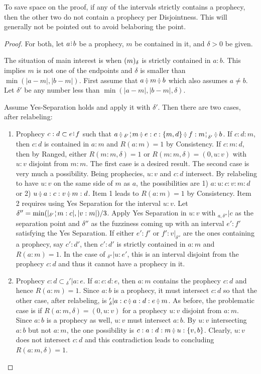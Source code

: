 \documentclass[12pt]{article}
\begin{document}
To save space on the proof, if any of the intervals strictly contains a prophecy, then the other two do not contain a prophecy per Disjointness. This will generally not be pointed out to avoid belaboring the point. 

\begin{proof}
    For both, let $a \rint b$ be a prophecy, $m$ be contained in it, and $\delta >0 $ be given.

    The situation of main interest is when $(m)_{\delta}$ is strictly contained in $a:b$. This implies $m$ is not one of the endpoints and $\delta$ is smaller than $\min(|a-m|, |b-m|)$. First assume that $a \betneq m \betneq b$ which also assumes $a \neq b$. Let $\delta'$ be any number less than $\min(|a-m|, |b-m|, \delta)$. 
    
    Assume Yes-Separation holds and apply it with $\delta'$. Then there are two cases, after relabeling: 

    \begin{enumerate}
        \item Prophecy $c:d \subset e\rint f$ such that $a\betneq \fuzbleft[\delta']{m} \betneq e : c : \{m, d\} \betneq f : \fuzbright[\delta']{m} \betneq b$. If $c:d:m$, then $c:d$ is contained in $a:m$ and $R(a:m)=1$ by Consistency. If $c:m:d$, then by Ranged, either $R(m:m, \delta) = 1$ or $R(m:m, \delta) = (0, u:v)$ with $u:v$ disjoint from $m:m$. The first case is a desired result. The second case is very much a possibility. Being prophecies, $u:v$ and $c:d$ intersect. By relabeling to have $u:v$ on the same side of $m$ as $a$, the possibilities are 1) $a:u:c:v:m:d$ or  2) $u \betneq a:c:v \betneq m:d$. Item 1 leads to $R(a:m) = 1$ by Consistency. Item 2 requires using Yes Separation for the interval $u:v$. Let $\delta'' = \min(|{}_{\delta'}\wall m:c|, |v:m|)/3 $. Apply Yes Separation in $u:v$ with ${}_{a,\delta''}|c$ as the separation point and $\delta''$ as the fuzziness coming up with an interval $e':f'$ satisfying the Yes Separation. If either $e':f'$ or $f':v|_{\delta''}$ are the ones containing a prophecy, say $c':d'$, then $c':d'$ is strictly contained in $a:m$ and $R(a:m) = 1$. In the case of ${}_{\delta''}|u:e'$, this is an interval disjoint from the prophecy $c:d$ and thus it cannot have a prophecy in it.
        \item Prophecy $c:d \subset {}_\delta'|a:e$. If $a:c:d:e$, then $a:m$ contains the prophecy $c:d$ and hence $R(a:m)=1$. Since $a:b$ is a prophecy, it must intersect $c:d$ so that the other case, after relabeling, is ${}_\delta'|a :c  \betneq a:d:e \betneq m$. As before, the problematic case is if $R(a:m, \delta) = (0, u:v)$ for a prophecy $u:v$ disjoint from $a:m$. Since $a:b$ is a prophecy as well, $u:v$ must intersect $a:b$. By $u:v$ intersecting $a:b$ but not $a:m$, the one possibility is $c:a:d:m \betneq u: \{v, b\}$. Clearly, $u:v$ does not intersect $c:d$ and this contradiction leads to concluding $R(a:m, \delta) = 1$. 
    \end{enumerate}



\end{proof}
\end{document}

